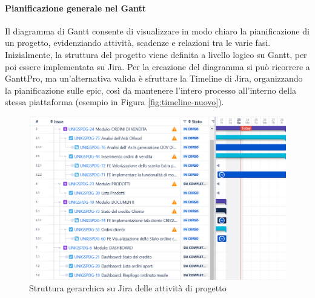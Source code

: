             \paragraph{Pianificazione generale nel Gantt}
            Il diagramma di Gantt consente di visualizzare in modo chiaro la pianificazione di un progetto, evidenziando
            attività, scadenze e relazioni tra le varie fasi. Inizialmente, la struttura del progetto viene definita a
            livello logico su Gantt, per poi essere implementata su Jira. Per la creazione del diagramma si può ricorrere
            a GanttPro, ma un’alternativa valida è sfruttare la Timeline di Jira, organizzando la pianificazione sulle epic,
            così da mantenere l’intero processo all’interno della stessa piattaforma (esempio in Figura \ref{fig:timeline-nuovo}).

            \begin{figure}
                \centering
                \includegraphics[scale=0.6]{figures/GanttJiraNuovo.png}
                \caption{Struttura gerarchica su Jira delle attività di progetto}
                \label{fig:gantt-nuovo}
            \end{figure}
